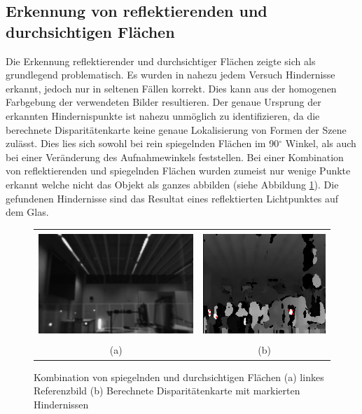\subsection{Erkennung von reflektierenden und durchsichtigen Flächen}
\label{subsec:reflection_discussion}

\noindent
Die Erkennung reflektierender und durchsichtiger Flächen zeigte sich als grundlegend problematisch. Es wurden in nahezu jedem Versuch Hindernisse erkannt, jedoch nur in seltenen Fällen korrekt. Dies kann aus der homogenen Farbgebung der verwendeten Bilder resultieren. Der genaue Ursprung der erkannten Hindernispunkte ist nahezu unmöglich zu identifizieren, da die berechnete Disparitätenkarte keine genaue Lokalisierung von Formen der Szene zulässt. Dies lies sich sowohl bei rein spiegelnden Flächen im 90$^\circ$ Winkel, als auch bei einer Veränderung des Aufnahmewinkels feststellen. Bei einer Kombination von reflektierenden und spiegelnden Flächen wurden zumeist nur wenige Punkte erkannt welche nicht das Objekt als ganzes abbilden (siehe Abbildung \ref{fig:combination_images}). Die gefundenen Hindernisse sind das Resultat eines reflektierten Lichtpunktes auf dem Glas. 

\begin{figure}[!h]
	\centering
	\begin{tabular}{cc}
		\includegraphics[height=4cm]{img/reflection/reflection_trans_left} &
		\includegraphics[height=4cm]{img/reflection/reflection_trans_disp} \\
		(a) & (b)
	\end{tabular}
	\caption{Kombination von spiegelnden und durchsichtigen Flächen (a) linkes Referenzbild (b) Berechnete Disparitätenkarte mit markierten Hindernissen}
	\label{fig:combination_images}
\end{figure}

